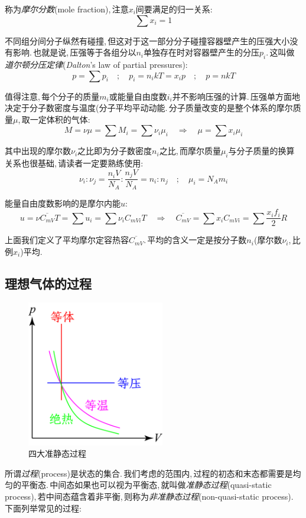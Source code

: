 称为\emph{摩尔分数}(mole fraction),\,注意$x_i$间要满足的归一关系:
\[\sum x_i=1\]

不同组分间分子纵然有碰撞,\,但这对于这一部分分子碰撞容器壁产生的压强大小没有影响.\,也就是说,\,压强等于各组分以$n_i$单独存在时对容器壁产生的分压$p_i$.\,这叫做\emph{道尔顿分压定律}({\it Dalton}'s law of partial pressures):
\[p=\sum p_i \quad ;\quad p_i=n_i kT=x_i p \quad ; \quad p=nkT\]

值得注意,\,每个分子的质量$m_i$或能量自由度数$i_i$并不影响压强的计算.\,压强单方面地决定于分子数密度与温度(分子平均平动动能.\,分子质量改变的是整个体系的摩尔质量$\mu$,\,取一定体积的气体:
\[M=\nu\mu=\sum M_i=\sum \nu_i\mu_i \quad \Rightarrow \quad \mu=\sum x_i \mu_i\]

其中出现的摩尔数$\nu_i$之比即为分子数密度$n_i$之比,\,而摩尔质量$\mu_i$与分子质量的换算关系也很基础,\,请读者一定要熟练使用:
\[\nu_i : \nu_j=\frac{n_i V}{N_A} : \frac{n_j V}{N_A}=n_i : n_j \quad ; \quad \mu_i=N_A m_i\]

能量自由度数影响的是摩尔内能$u$:
\[u=\nu \overline{C_{mV}} T=\sum u_i=\sum \nu_i C_{mVi} T \quad \Rightarrow \quad \overline{C_{mV}}=\sum x_i C_{mVi}=\sum \frac{x_i f_i}{2}R\]

上面我们定义了平均摩尔定容热容$\overline{C_{mV}}$.\,平均的含义一定是按分子数$n_i$(摩尔数$\nu_i$,\,比例$x_i$)平均.

\subsection{理想气体的过程}
\begin{figure}
\includegraphics[width=6cm]{image/5-1-6.png}
\caption{四大准静态过程}\label{fig:1-6}
\end{figure}
所谓\emph{过程}(process)是状态的集合.\,我们考虑的范围内,\,过程的初态和末态都需要是均匀的平衡态.\,中间态如果也可以视为平衡态,\,就叫做\emph{准静态过程}(quasi-static process),\,若中间态蕴含着非平衡,\,则称为\emph{非准静态过程}(non-quasi-static process).\,下面列举常见的过程:
